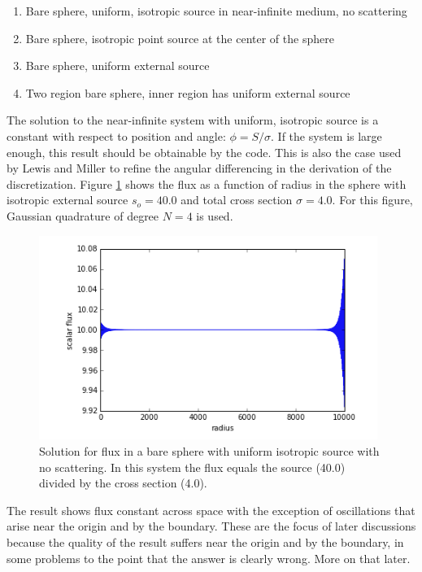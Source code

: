 \documentclass[11pt, oneside]{article}   	%
\begin{document}
\begin{enumerate}
\item Bare sphere, uniform, isotropic source in near-infinite medium, no scattering
\item Bare sphere, isotropic point source at the center of the sphere
\item Bare sphere, uniform external source
\item Two region bare sphere, inner region has uniform external source 
\end{enumerate}

The solution to the near-infinite system with uniform, isotropic source is a constant with respect to position and angle: $\phi = S/\sigma$. If the system is large enough, this result should be obtainable by the code. This is also the case used by Lewis and Miller \cite{lm} to refine the angular differencing in the derivation of the discretization. Figure \ref{fig:near_inf_uniform} shows the flux as a function of radius in the sphere with isotropic external source $s_o = 40.0$ and total cross section $\sigma = 4.0$. For this figure, Gaussian quadrature of degree $N=4$ is used.
%
\begin{figure}
\centering
\includegraphics[width=11cm]{uniform_src_near_inf}
\caption{Solution for flux in a bare sphere with uniform isotropic source with no scattering. In this system the flux equals the source (40.0) divided by the cross section (4.0).}
\label{fig:near_inf_uniform}
\end{figure}
%
The result shows flux constant across space with the exception of oscillations that arise near the origin and by the boundary. These are the focus of later discussions because the quality of the result suffers near the origin and by the boundary, in some problems to the point that the answer is clearly wrong. More on that later.
\end{document}

